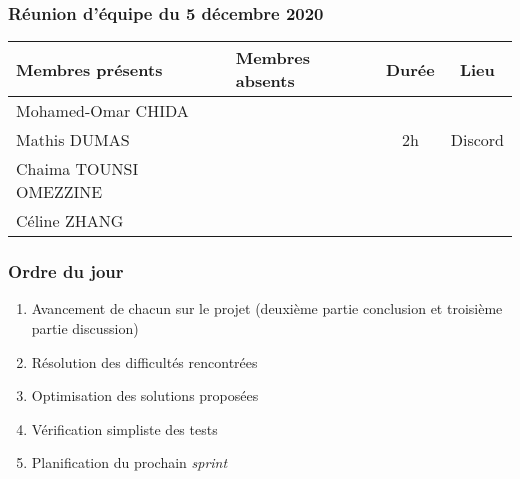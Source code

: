 


% 
\subsubsection*{\large{Réunion d'équipe du 5 décembre 2020}}
\begin{center}
\begin{tabular}{| l | l || c | c |}
    \hline
    Membres présents & Membres absents & Durée & Lieu \\
    \hline
    Mohamed-Omar CHIDA & & & \\ Mathis DUMAS & & 2h & Discord \\ Chaima TOUNSI OMEZZINE & & & \\ Céline ZHANG & & & \\
    \hline
\end{tabular}
\end{center}

\subsubsection*{Ordre du jour}
\begin{enumerate}
    \item Avancement de chacun sur le projet (deuxième partie conclusion et troisième partie discussion)
    \item Résolution des difficultés rencontrées
    \item Optimisation des solutions proposées
    \item Vérification simpliste des tests
    \item Planification du prochain \textsl{sprint}
\end{enumerate}

